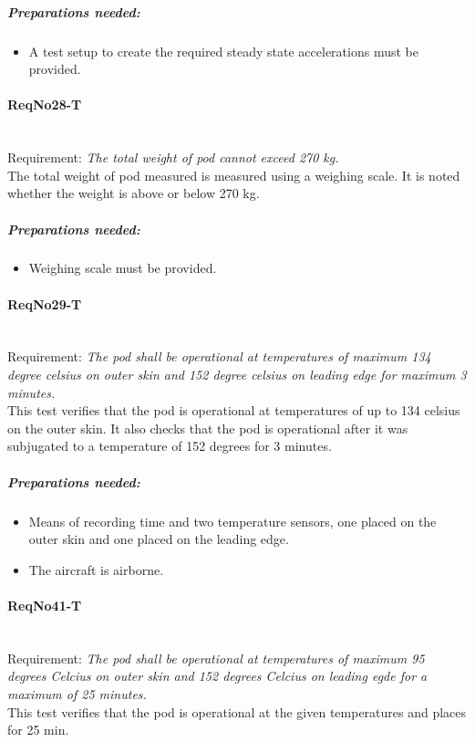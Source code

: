 \subparagraph{Preparations needed:}
	\begin{itemize}
	\item A test setup to create the required steady state accelerations must be provided.
	\end{itemize} 
	

\paragraph{ReqNo28-T}\mbox{}\\ %
Requirement: \textit{The total weight of pod cannot exceed 270 kg.}
\\
The total weight of pod measured is measured using a weighing scale. It is noted whether the weight is above or below 270 kg.
\\
	\subparagraph{Preparations needed:}
	\begin{itemize}
	\item Weighing scale must be provided.
	\end{itemize} 

\paragraph{ReqNo29-T}\mbox{}\\ %
Requirement: \textit{The pod shall be operational at temperatures of maximum 134 degree celsius on outer skin and 152 degree celsius on leading edge for maximum 3 minutes.}
\\
This test verifies that the pod is operational at temperatures of up to 134 celsius on the outer skin. It also checks that the pod is operational after it was subjugated to a temperature of 152 degrees for 3 minutes.
\\
	\subparagraph{Preparations needed:}
	\begin{itemize}
	\item Means of recording time and two temperature sensors, one placed on the outer skin and one placed on the leading edge.
	\item The aircraft is airborne.
	\end{itemize} 


\paragraph{ReqNo41-T}\mbox{}\\ %
Requirement: \textit{The pod shall be operational at temperatures of maximum 95 degrees Celcius on outer skin and 152 degrees Celcius on leading egde for a maximum of 25 minutes.}\\
This test verifies that the pod is operational at the given temperatures and places for 25 min.\\

